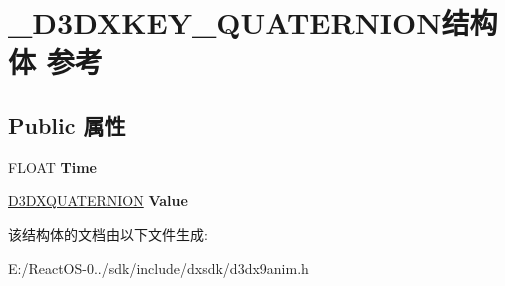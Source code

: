 \hypertarget{struct___d3_d_x_k_e_y___q_u_a_t_e_r_n_i_o_n}{}\section{\+\_\+\+D3\+D\+X\+K\+E\+Y\+\_\+\+Q\+U\+A\+T\+E\+R\+N\+I\+O\+N结构体 参考}
\label{struct___d3_d_x_k_e_y___q_u_a_t_e_r_n_i_o_n}
\subsection*{Public 属性}
\begin{DoxyCompactItemize}
\item 
\mbox{\label{struct___d3_d_x_k_e_y___q_u_a_t_e_r_n_i_o_n_ada8414f8257197b360b2e707f5124b26}} 
F\+L\+O\+AT {\bfseries Time}
\item 
\mbox{\label{struct___d3_d_x_k_e_y___q_u_a_t_e_r_n_i_o_n_ad4135e5dda53492f618a85fcb41c18e0}} 
\hyperlink{struct_d3_d_x_q_u_a_t_e_r_n_i_o_n}{D3\+D\+X\+Q\+U\+A\+T\+E\+R\+N\+I\+ON} {\bfseries Value}
\end{DoxyCompactItemize}


该结构体的文档由以下文件生成\+:\begin{DoxyCompactItemize}
\item 
E\+:/\+React\+O\+S-\/0../sdk/include/dxsdk/d3dx9anim.\+h\end{DoxyCompactItemize}
